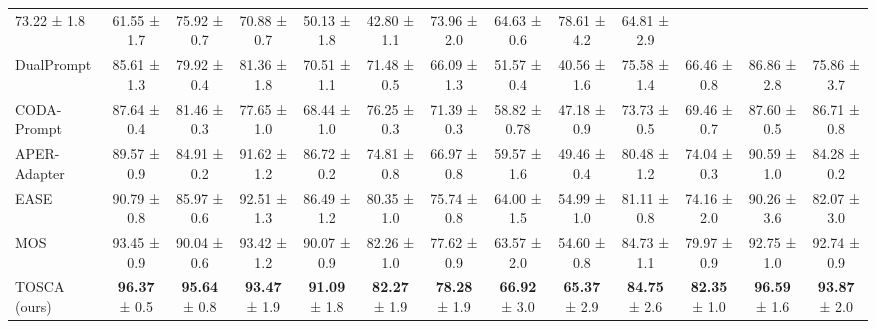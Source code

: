 \begin{table}[h]
{\begin{tabular}{lcccccccccccc}
  73.22 \footnotesize{± 1.8} &
  61.55 \footnotesize{± 1.7} &
  75.92 \footnotesize{± 0.7} &
  70.88 \footnotesize{± 0.7} &
  50.13 \footnotesize{± 1.8} &
  42.80 \footnotesize{± 1.1} &
  73.96 \footnotesize{± 2.0} &
  64.63 \footnotesize{± 0.6} &
  78.61 \footnotesize{± 4.2} &
  64.81 \footnotesize{± 2.9} \\
DualPrompt &
  85.61 \footnotesize{± 1.3} &
  79.92 \footnotesize{± 0.4} &
  81.36 \footnotesize{± 1.8} &
  70.51 \footnotesize{± 1.1} &
  71.48 \footnotesize{± 0.5} &
  66.09 \footnotesize{± 1.3} &
  51.57 \footnotesize{± 0.4} &
  40.56 \footnotesize{± 1.6} &
  75.58 \footnotesize{± 1.4} &
  66.46 \footnotesize{± 0.8} &
  86.86 \footnotesize{± 2.8} &
  75.86 \footnotesize{± 3.7} \\
CODA-Prompt &
  87.64 \footnotesize{± 0.4} &
  81.46 \footnotesize{± 0.3} &
  77.65 \footnotesize{± 1.0} &
  68.44 \footnotesize{± 1.0} &
  76.25 \footnotesize{± 0.3} &
  71.39 \footnotesize{± 0.3} &
  58.82 \footnotesize{± 0.78} &
  47.18 \footnotesize{± 0.9} &
  73.73 \footnotesize{± 0.5} &
  69.46 \footnotesize{± 0.7} &
  87.60 \footnotesize{± 0.5} &
  86.71 \footnotesize{± 0.8} \\
APER-Adapter &
  89.57 \footnotesize{± 0.9} &
  84.91 \footnotesize{± 0.2} &
  91.62 \footnotesize{± 1.2} &
  86.72 \footnotesize{± 0.2} &
  74.81 \footnotesize{± 0.8} &
  66.97 \footnotesize{± 0.8} &
  59.57 \footnotesize{± 1.6} &
  49.46 \footnotesize{± 0.4} &
  80.48 \footnotesize{± 1.2} &
  74.04 \footnotesize{± 0.3} &
  90.59 \footnotesize{± 1.0} &
  84.28 \footnotesize{± 0.2} \\
EASE &
  90.79 \footnotesize{± 0.8} &
  85.97 \footnotesize{± 0.6} &
  92.51 \footnotesize{± 1.3} &
  86.49 \footnotesize{± 1.2} &
  80.35 \footnotesize{± 1.0}&
  75.74 \footnotesize{± 0.8}&
  64.00 \footnotesize{± 1.5}&
  54.99 \footnotesize{± 1.0} &
  81.11 \footnotesize{± 0.8} &
  74.16 \footnotesize{± 2.0} &
  90.26 \footnotesize{± 3.6} &
  82.07 \footnotesize{± 3.0} \\
MOS &
  93.45 \footnotesize{± 0.9} &
  90.04 \footnotesize{± 0.6} &
  93.42 \footnotesize{± 1.2} &
  90.07 \footnotesize{± 0.9} &
  82.26 \footnotesize{± 1.0} &
  77.62 \footnotesize{± 0.9} &
  63.57 \footnotesize{± 2.0} &
  54.60 \footnotesize{± 0.8} &
  84.73 \footnotesize{± 1.1} &
  79.97 \footnotesize{± 0.9} &
  92.75 \footnotesize{± 1.0} &
  92.74 \footnotesize{± 0.9} \\ \hline
\rowcolor{pink!20}
TOSCA (ours) &
  \textbf{96.37} \footnotesize{± 0.5} &
  \textbf{95.64} \footnotesize{± 0.8} &
  \textbf{93.47} \footnotesize{± 1.9} &
  \textbf{91.09} \footnotesize{± 1.8} &
  \textbf{82.27} \footnotesize{± 1.9} &
  \textbf{78.28} \footnotesize{± 1.9} &
  \textbf{66.92} \footnotesize{± 3.0} &
  \textbf{65.37} \footnotesize{± 2.9} &
  \textbf{84.75} \footnotesize{± 2.6} &
  \textbf{82.35} \footnotesize{± 1.0} &
  \textbf{96.59} \footnotesize{± 1.6} &
  \textbf{93.87} \footnotesize{± 2.0} \\ \hline
\end{tabular}%
}
\vskip -0.1cm
\end{table}

